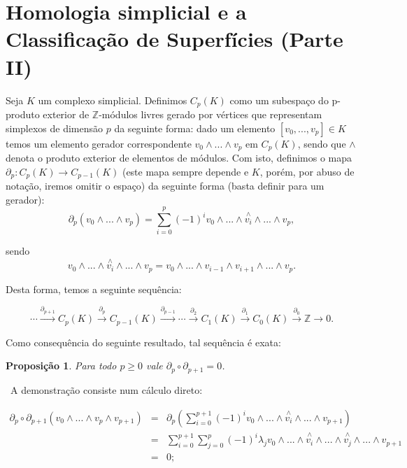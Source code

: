\documentclass[12pt,a4paper]{article}
\newtheorem{prop}[mydef]{Proposição}
\def\dem{\par\smallbreak\noindent {\textit{ Demonstração:}} \ }
\theoremstyle{definition}
\begin{document}
\section{Homologia simplicial e a Classificação de Superfícies (Parte II)}

Seja $K$ um complexo simplicial. Definimos $C_p(K)$ como um subespaço do p-produto exterior de $\mathbb{Z}$-módulos livres gerado por vértices que representam simplexos de dimensão $p$ da seguinte forma: dado um elemento $[v_0,...,v_p]\in K$ temos um elemento gerador correspondente $v_0\wedge ... \wedge v_p$ em $C_p(K)$, sendo que $\wedge$ denota o produto exterior de elementos de módulos. Com isto, definimos o mapa $\partial_p: C_p(K)\rightarrow C_{p-1}(K)$ (este mapa sempre depende e $K$, porém, por abuso de notação, iremos omitir o espaço) da seguinte forma (basta definir para um gerador): $$\partial_p(v_0\wedge ... \wedge v_p) =\sum_{i=0}^p (-1)^i v_0 \wedge ... \wedge \overset{ \wedge}{v_i} \wedge ... \wedge v_p, $$

sendo $$v_0 \wedge ... \wedge \overset{ \wedge}{v_i} \wedge ... \wedge v_p = v_0 \wedge ... \wedge v_{i-1} \wedge v_{i+1} \wedge ... \wedge v_p.$$

Desta forma, temos a seguinte sequência:

$$\cdots\overset{\partial_{p+1}}{\rightarrow} C_p(K) \overset{\partial_p}{\rightarrow} C_{p-1}(K) \overset{\partial_{p-1}}{\rightarrow} \cdots \overset{\partial_{2}}{\rightarrow} C_{1}(K) \overset{\partial_{1}}{\rightarrow}C_{0}(K) \overset{\partial_{0}}{\rightarrow}\mathbb{Z}\rightarrow 0. $$

Como consequência do seguinte resultado, tal sequência é exata:

\begin{prop}

    Para todo $p\geq 0$ vale $\partial_{p}\circ \partial_{p+1}=0$.

\end{prop}

\dem A demonstração consiste num cálculo direto: 


$$\begin{array}{rcl}
    \partial_p\circ \partial_{p+1}(v_0\wedge ... \wedge v_p\wedge v_{p+1}) & = & \partial_p \left(\displaystyle\sum_{i=0}^{p+1} (-1)^i v_0 \wedge ... \wedge \overset{ \wedge}{v_i} \wedge ... \wedge  v_{p+1} \right) \\
     & = & \displaystyle\sum_{i=0}^{p+1} \displaystyle\sum_{j=0}^{p}  (-1)^{i} \lambda_j v_0 \wedge ... \wedge \overset{ \wedge}{v_i} \wedge ... \wedge  \overset{ \wedge}{v_j}\wedge ... \wedge v_{p+1} \\
     & = & 0;
\end{array}$$
\end{document}
